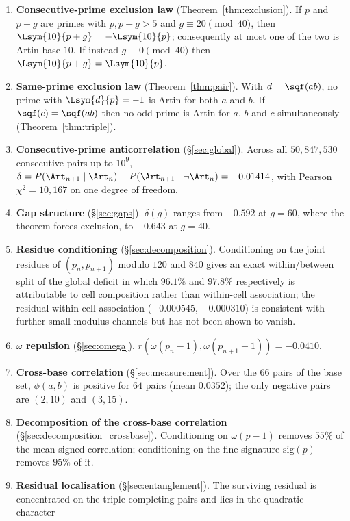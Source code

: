 \begin{enumerate}
	\item \textbf{Consecutive-prime exclusion law} (Theorem~\ref{thm:exclusion}). If $p$ and
	$p+g$ are primes with $p,p+g>5$ and $g\equiv 20 \pmod{40}$, then
	$\Lsym{10}{p+g}=-\Lsym{10}{p}$; consequently at most one of the two is Artin base $10$.
	If instead $g\equiv 0 \pmod{40}$ then $\Lsym{10}{p+g}=\Lsym{10}{p}$.
	\item \textbf{Same-prime exclusion law} (Theorem~\ref{thm:pair}). With $d=\sqf(ab)$, no
	prime with $\Lsym{d}{p}=-1$ is Artin for both $a$ and $b$. If $\sqf(c)=\sqf(ab)$ then no
	odd prime is Artin for $a$, $b$ and $c$ simultaneously (Theorem~\ref{thm:triple}).
	\item \textbf{Consecutive-prime anticorrelation} (\S\ref{sec:global}). Across all
	$50{,}847{,}530$ consecutive pairs up to $10^9$,
	$\delta = P(\Art_{n+1}\mid\Art_n)-P(\Art_{n+1}\mid\lnot\Art_n) = -0.01414$, with
	Pearson $\chi^2 = 10{,}167$ on one degree of freedom.
	\item \textbf{Gap structure} (\S\ref{sec:gaps}). $\delta(g)$ ranges from $-0.592$ at
	$g=60$, where the theorem forces exclusion, to $+0.643$ at $g=40$.
	\item \textbf{Residue conditioning} (\S\ref{sec:decomposition}). Conditioning on the
	joint residues of $(p_n,p_{n+1})$ modulo $120$ and $840$ gives an exact within/between split
	of the global deficit in which $96.1\%$ and $97.8\%$ respectively is attributable to cell
	composition rather than within-cell association; the residual within-cell association
	($-0.000545$, $-0.000310$) is consistent with further small-modulus channels but has not
	been shown to vanish.
	\item \textbf{$\omega$ repulsion} (\S\ref{sec:omega}).
	$r(\omega(p_n-1),\omega(p_{n+1}-1)) = -0.0410$.
	\item \textbf{Cross-base correlation} (\S\ref{sec:measurement}). Over the $66$ pairs of
	the base set, $\phi(a,b)$ is positive for $64$ pairs (mean $0.0352$); the only negative
	pairs are $(2,10)$ and $(3,15)$.
	\item \textbf{Decomposition of the cross-base correlation} (\S\ref{sec:decomposition_crossbase}).
	Conditioning on $\omega(p-1)$ removes $55\%$ of the mean signed correlation; conditioning
	on the fine signature $\mathrm{sig}(p)$ removes $95\%$ of it.
	\item \textbf{Residual localisation} (\S\ref{sec:entanglement}). The surviving residual
	is concentrated on the triple-completing pairs and lies in the quadratic-character

\end{enumerate}
